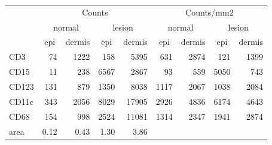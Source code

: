 \documentclass{article}
\begin{document}
\begin{tabular}{lrrrr|rrrr}
   \hline
 
             \multicolumn{1}{c}{} & \multicolumn{4}{c|}{Counts} & \multicolumn{4}{c}{Counts/mm2} \\ 
             \multicolumn{1}{c}{} & \multicolumn{2}{c}{normal} & \multicolumn{2}{c|}{lesion} & \multicolumn{2}{c}{normal} & \multicolumn{2}{c}{lesion}  \\ 
             \multicolumn{1}{c}{} & \multicolumn{1}{c}{epi} & dermis & \multicolumn{1}{c}{epi} & \multicolumn{1}{c|}{dermis} & \multicolumn{1}{c}{epi} & dermis & \multicolumn{1}{c}{epi} & dermis  \\ 
             \hline
        CD3 & 74 & 1222 & 158 & 5395 & 631 & 2874 & 121 & 1399 \\ 
  CD15 & 11 & 238 & 6567 & 2867 & 93 & 559 & 5050 & 743 \\ 
  CD123 & 131 & 879 & 1350 & 8038 & 1117 & 2067 & 1038 & 2084 \\ 
  CD11c & 343 & 2056 & 8029 & 17905 & 2926 & 4836 & 6174 & 4643 \\ 
  CD68 & 154 & 998 & 2524 & 11081 & 1314 & 2347 & 1941 & 2874 \\ 
  area & 0.12 & 0.43 & 1.30 & 3.86 &    &    &    &    \\ 
   \hline
\end{tabular}
\end{document}
